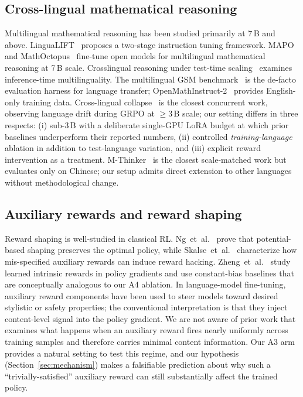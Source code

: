 \documentclass[journal,onecolumn,11pt]{IEEEtran}
\newcommand{\armC}{\textsc{A3}}
\newcommand{\armD}{\textsc{A4}}
\begin{document}
\subsection{Cross-lingual mathematical reasoning}
Multilingual mathematical reasoning has been studied primarily at 7\,B and
above. LinguaLIFT~\cite{lingualift_2024} proposes a two-stage instruction
tuning framework. MAPO~\cite{mapo_2024} and
MathOctopus~\cite{mathoctopus_2024} fine-tune open models for multilingual
mathematical reasoning at 7\,B scale. Crosslingual reasoning under
test-time scaling~\cite{xreasoning_test_time_2025} examines inference-time
multilinguality. The multilingual GSM benchmark~\cite{mgsm_2022} is the
de-facto evaluation harness for language transfer; OpenMathInstruct-2~%
\cite{openmathinstruct2_2024} provides English-only training data.
Cross-lingual collapse~\cite{xlingual_collapse_2025} is the closest concurrent
work, observing language drift during GRPO at $\geq 3$\,B scale; our setting
differs in three respects: (i) sub-3\,B with a deliberate single-GPU LoRA
budget at which prior baselines underperform their reported numbers,
(ii) controlled \emph{training-language} ablation in addition to
test-language variation, and (iii) explicit reward intervention as a
treatment. M-Thinker~\cite{mthinker_2025} is the closest scale-matched work
but evaluates only on Chinese; our setup admits direct extension to other
languages without methodological change.

\subsection{Auxiliary rewards and reward shaping}
Reward shaping is well-studied in classical RL.
Ng~et~al.~\cite{ng1999policy} prove that potential-based shaping preserves
the optimal policy, while Skalse~et~al.~\cite{skalse2022rewardhacking}
characterize how mis-specified auxiliary rewards can induce reward
hacking. Zheng~et~al.~\cite{zheng_intrinsic_2018} study learned intrinsic
rewards in policy gradients and use constant-bias baselines that are
conceptually analogous to our \armD{} ablation. In language-model fine-tuning, auxiliary reward
components have been used to steer models toward desired stylistic or
safety properties; the conventional interpretation is that they inject
content-level signal into the policy gradient. We are not aware of prior
work that examines what happens when an auxiliary reward fires nearly
uniformly across training samples and therefore carries minimal content
information. Our \armC{} arm provides a natural setting to test this
regime, and our hypothesis (Section~\ref{sec:mechanism}) makes a
falsifiable prediction about why such a ``trivially-satisfied'' auxiliary
reward can still substantially affect the trained policy.
\end{document}
